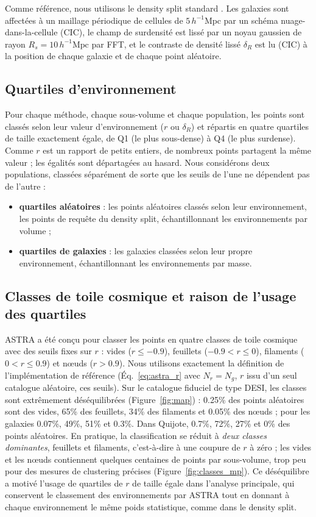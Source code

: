 \documentclass[11pt,twocolumn]{article}
\newcommand{\Mpch}{\,h^{-1}\mathrm{Mpc}}
\begin{document}
Comme référence, nous utilisons le density split standard \cite{Paillas2023}. Les galaxies sont affectées à un maillage périodique de cellules de $5\Mpch$ par un schéma nuage-dans-la-cellule (CIC), le champ de surdensité est lissé par un noyau gaussien de rayon $R_s=10\Mpch$ par FFT, et le contraste de densité lissé $\delta_R$ est lu (CIC) à la position de chaque galaxie et de chaque point aléatoire.

\subsection{Quartiles d'environnement}

Pour chaque méthode, chaque sous-volume et chaque population, les points sont classés selon leur valeur d'environnement ($r$ ou $\delta_R$) et répartis en quatre quartiles de taille exactement égale, de Q1 (le plus sous-dense) à Q4 (le plus surdense). Comme $r$ est un rapport de petits entiers, de nombreux points partagent la même valeur ; les égalités sont départagées au hasard. Nous considérons deux populations, classées séparément de sorte que les seuils de l'une ne dépendent pas de l'autre :
\begin{itemize}
\item \textbf{quartiles aléatoires} : les points aléatoires classés selon leur environnement, les points de requête du density split, échantillonnant les environnements par volume ;
\item \textbf{quartiles de galaxies} : les galaxies classées selon leur propre environnement, échantillonnant les environnements par masse.
\end{itemize}

\subsection{Classes de toile cosmique et raison de l'usage des quartiles}
\label{sec:classes_def}

ASTRA a été conçu pour classer les points en quatre classes de toile cosmique avec des seuils fixes sur $r$ \cite{ASTRA} : vides ($r\le-0.9$), feuillets ($-0.9<r\le0$), filaments ($0<r\le0.9$) et nœuds ($r>0.9$). Nous utilisons exactement la définition de l'implémentation de référence (Éq.~\ref{eq:astra_r} avec $N_r=N_g$, $r$ issu d'un seul catalogue aléatoire, ces seuils). Sur le catalogue fiduciel de type DESI, les classes sont extrêmement déséquilibrées (Figure~\ref{fig:map}) : 0.25\% des points aléatoires sont des vides, 65\% des feuillets, 34\% des filaments et 0.05\% des nœuds ; pour les galaxies 0.07\%, 49\%, 51\% et 0.3\%. Dans Quijote, 0.7\%, 72\%, 27\% et 0\% des points aléatoires. En pratique, la classification se réduit à \emph{deux classes dominantes}, feuillets et filaments, c'est-à-dire à une coupure de $r$ à zéro ; les vides et les nœuds contiennent quelques centaines de points par sous-volume, trop peu pour des mesures de clustering précises (Figure~\ref{fig:classes_mp}). Ce déséquilibre a motivé l'usage de quartiles de $r$ de taille égale dans l'analyse principale, qui conservent le classement des environnements par ASTRA tout en donnant à chaque environnement le même poids statistique, comme dans le density split.
\end{document}
